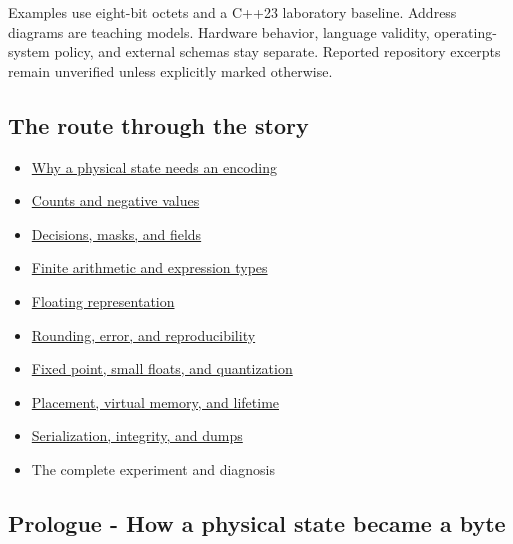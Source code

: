Examples use eight-bit octets and a C++23 laboratory baseline. Address diagrams are teaching models. Hardware behavior, language validity, operating-system policy, and external schemas stay separate. Reported repository excerpts remain unverified unless explicitly marked otherwise.

\subsection{The route through the story}\label{01-foundations-i-ch001-the-route-through-the-story}

\hypertarget{01-foundations-i-ch001-the-route-through-the-story}{}

\begin{itemize}
\tightlist
\item
  \hyperref[01-foundations-i-ch001-prologue---how-a-physical-state-became-a-byte]{Why a physical state needs an encoding}
\item
  \hyperref[01-foundations-i-ch001-from-a-signal-to-an-interpretation]{Counts and negative values}
\item
  \hyperref[01-foundations-i-ch001-bits-become-decisions-and-compact-fields]{Decisions, masks, and fields}
\item
  \hyperref[01-foundations-i-ch001-arithmetic-becomes-a-policy]{Finite arithmetic and expression types}
\item
  \hyperref[01-foundations-i-ch001-a-stretching-ruler-for-real-valued-quantities]{Floating representation}
\item
  \hyperref[01-foundations-i-ch001-when-arithmetic-meets-uncertainty]{Rounding, error, and reproducibility}
\item
  \hyperref[01-foundations-i-ch001-choosing-what-information-to-keep]{Fixed point, small floats, and quantization}
\item
  \hyperref[01-foundations-i-ch002-where-the-bytes-live]{Placement, virtual memory, and lifetime}
\item
  \hyperref[01-foundations-i-ch002-bytes-become-a-durable-agreement]{Serialization, integrity, and dumps}
\item
  {The complete experiment and diagnosis}
\end{itemize}

\subsection{Prologue - How a physical state became a byte}\label{01-foundations-i-ch001-prologue---how-a-physical-state-became-a-byte}

